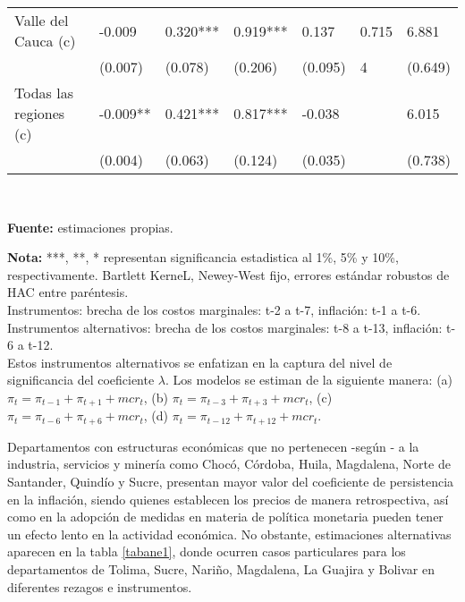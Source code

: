 \begin{table}%
\centering
\begin{tabular}{lllllll}
\vspace{-0.3cm}Valle del Cauca  (c) & -0.009 & 0.320*** & 0.919*** & 0.137 & 0.715 & 6.881\\   
& \scriptsize{(0.007)} & \scriptsize{(0.078)} & \scriptsize{(0.206)} & \scriptsize{(0.095)} & \scriptsize{4}     & \scriptsize{(0.649)} \\
\vspace{-0.3cm}Todas las regiones (c) & -0.009** & 0.421*** & 0.817*** & -0.038 &       & 6.015\\   
& \scriptsize{(0.004)} & \scriptsize{(0.063)} & \scriptsize{(0.124)} & \scriptsize{(0.035)} &       & \scriptsize{(0.738)} \\
\hline
\end{tabular}
\label{tab:addlabel}\\
  \raggedright  \scriptsize \textbf{Fuente:} estimaciones propias.\\
\raggedright  \scriptsize \textbf{Nota:} ***,  **, * representan significancia estadistica al 1\%, 5\% y 10\%, respectivamente. Bartlett KerneL, Newey-West fijo, errores estándar robustos de HAC entre paréntesis.\\
Instrumentos: brecha de los costos marginales: t-2 a t-7, inflación: t-1 a t-6.\\
\dag Instrumentos alternativos: brecha de los costos marginales: t-8 a t-13, inflación: t-6 a t-12. \\
Estos instrumentos alternativos se enfatizan en la captura del nivel de significancia del coeficiente $\lambda$.
Los modelos se estiman de la siguiente manera: (a) $\pi_{t}=\pi_{t-1}+\pi_{t+1}+mcr_{t}$, (b) $\pi_{t}=\pi_{t-3}+\pi_{t+3}+mcr_{t}$, (c) $\pi_{t}=\pi_{t-6}+\pi_{t+6}+mcr_{t}$, (d) $\pi_{t}=\pi_{t-12}+\pi_{t+12}+mcr_{t}$.
\end{table}%


Departamentos con estructuras económicas que no pertenecen -según \cite{quintero2019impactos}- a  la industria, servicios y minería como Chocó, Córdoba, Huila, Magdalena, Norte de Santander, Quindío y Sucre, presentan mayor valor  del coeficiente de persistencia en la inflación, siendo quienes establecen los precios de manera retrospectiva, así como en la adopción de medidas en materia de política monetaria pueden tener un efecto lento en la actividad económica. No obstante, estimaciones alternativas aparecen en la tabla \ref{tabane1}, donde ocurren casos particulares para los departamentos de Tolima, Sucre, Nariño, Magdalena, La Guajira y Bolivar en diferentes rezagos e instrumentos.\\

